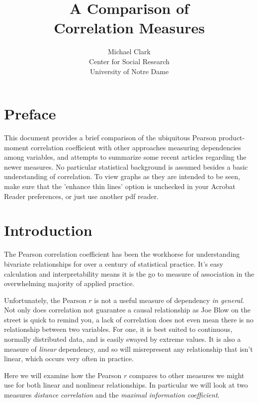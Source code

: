 \documentclass[english,nohyper,titlepage]{tufte-handout}\usepackage{graphicx, color}
\title{\huge{A Comparison of \\\noindent Correlation Measures}}
\author{{\small Michael Clark\\
         \noindent Center for Social Research\\
         \noindent University of Notre Dame\\}}
\begin{document}


\maketitle
\pagebreak{}
\tableofcontents{}

\pagebreak{}

\part{Preface} %
This document provides a brief comparison of the ubiquitous Pearson product-moment correlation coefficient with other approaches measuring dependencies among variables, and attempts to summarize some recent articles regarding the newer measures.  No particular statistical background is assumed besides a basic understanding of correlation.  To view graphs as they are intended to be seen, make sure that the 'enhance thin lines' option is unchecked in your Acrobat Reader preferences, or just use another pdf reader.
\pagebreak{}


\part{Introduction} %
The Pearson correlation coefficient has been the workhorse for understanding bivariate relationships for over a century of statistical practice.  It's easy calculation and interpretability means it is the go to measure of association in the overwhelming majority of applied practice.

Unfortunately, the Pearson $r$ is not a useful measure of dependency \emph{in general}.  Not only does correlation not guarantee a causal relationship as Joe Blow on the street is quick to remind you, a lack of correlation does not even mean there is no relationship between two variables.  For one, it is best suited to continuous, normally distributed data, and is easily swayed by extreme values. It is also a measure of \emph{linear} dependency, and so will misrepresent any relationship that isn't linear, which occurs very often in practice.

Here we will examine how the Pearson $r$ compares to other measures we might use for both linear and nonlinear relationships.  In particular we will look at two measures \emph{distance correlation} and the \emph{maximal information coefficient}.
\end{document}
